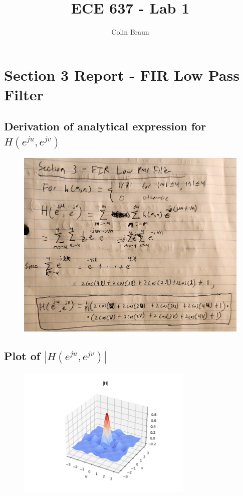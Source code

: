 \documentclass{article}
\title{ECE 637 - Lab 1}
\author{Colin Braun}
\begin{document}
\maketitle

\section{Section 3 Report - FIR Low Pass Filter}
\subsection{Derivation of analytical expression for $H(e^{ju}, e^{jv})$}
\begin{figure}[H]
    \centering
    \includegraphics[width=1\textwidth]{../results/ece637-lab1_1.jpg}
    \begin{center}
    \end{center}
\end{figure}
\subsection{Plot of $|H(e^{ju}, e^{jv})|$}
\begin{figure}[H]
    \centering
    \includegraphics[width=0.75\textwidth]{../results/section3-python.png}
    \begin{center}
    \end{center}
\end{figure}
\end{document}
